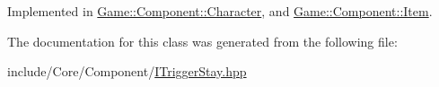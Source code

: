Implemented in \mbox{\hyperlink{class_game_1_1_component_1_1_character_ab0ac4d77a9403cded5c52d77121a625c}{Game\+::\+Component\+::\+Character}}, and \mbox{\hyperlink{class_game_1_1_component_1_1_item_a02230f3771a83e4a77035cb0ec4c04be}{Game\+::\+Component\+::\+Item}}.



The documentation for this class was generated from the following file\+:\begin{DoxyCompactItemize}
\item 
include/\+Core/\+Component/\mbox{\hyperlink{_i_trigger_stay_8hpp}{I\+Trigger\+Stay.\+hpp}}\end{DoxyCompactItemize}
